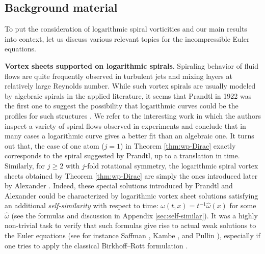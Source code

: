 \documentclass[10pt]{article}
\newtheorem{proposition}[theorem]{Proposition}
\theoremstyle{definition}
\theoremstyle{remark}
\numberwithin{equation}{section}
\newcommand{\nrm}[1]{\Vert#1\Vert}
\newcommand{\0}{\emptyset}
\newcommand{\bt}{\beta}
\newcommand{\omg}{\omega}
\newcommand{\bbS}{\mathbb S}
\newcommand{\calM}{\mathcal M}
\begin{document}

 
 
 
 \subsection{Background material}
	
	To put the consideration of logarithmic spiral vorticities and our main results into context, let us discuss various relevant topics for the incompressible Euler equations. 

    \medskip 
 
    \noindent\textbf{Vortex sheets supported on logarithmic spirals}. Spiraling behavior of fluid flows are quite frequently observed in turbulent jets and mixing layers at relatively large Reynolds number. While such vortex spirals are usually modeled by algebraic spirals in the applied literature, it seems that Prandtl in 1922 was the first one to suggest the possibility that logarithmic curves could be the profiles for such structures \cite{Prandtl61}. We refer to the interesting work \cite{Spiral} in which the authors inspect a variety of spiral flows observed in experiments and conclude that in many cases a logarithmic curve gives a better fit than an algebraic one. It turns out that, the case of one atom ($j=1$) in Theorem \ref{thm:wp-Dirac} exactly corresponds to the spiral suggested by Prandtl, up to a translation in time. Similarly, for $j\ge2$ with $j$-fold rotational symmetry, the logarithmic spiral vortex sheets obtained by Theorem \ref{thm:wp-Dirac} are simply the ones introduced later by Alexander \cite{Alexander71}. Indeed, these special solutions introduced by Prandtl and Alexander could be characterized by logarithmic vortex sheet solutions satisfying an additional \textit{self-similarity} with respect to time: $\omg(t,x)=t^{-1}\hat{\omg}(x)$ for some $\hat{\omg}$ (see the formulas and discussion in Appendix \ref{sec:self-similar}).  It was a highly non-trivial task to verify that such formulas give rise to actual weak solutions to the Euler equations (see for instance Saffman \cite[Section 8.3]{Saff}, Kambe \cite{Kam}, and Pullin \cite{Pull}), especially if one tries to apply the classical Birkhoff--Rott formulation \cite{Birkhoff,Rott}. 
    
\end{document}
